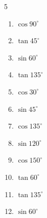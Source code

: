 \begin{multicols}{5}
\begin{enumerate}
        \phantom{$\displaystyle =-1$}

  \item $\displaystyle \cos{90^\circ}$

        \phantom{$\displaystyle =0$}

  \item $\displaystyle \tan{45^\circ}$

        \phantom{$\displaystyle =1$}

  \item $\displaystyle \sin{60^\circ}$


  \item $\displaystyle \tan{135^\circ}$

        \phantom{$\displaystyle =-1$}

  \item $\displaystyle \cos{30^\circ}$


  \item $\displaystyle \sin{45^\circ}$


  \item $\displaystyle \cos{135^\circ}$


\columnbreak %

  \item $\displaystyle \sin{120^\circ}$


  \item $\displaystyle \cos{150^\circ}$


  \item $\displaystyle \tan{60^\circ}$


  \item $\displaystyle \tan{135^\circ}$

        \phantom{$\displaystyle =-1$}

  \item $\displaystyle \sin{60^\circ}$



\end{enumerate}
\end{multicols}
